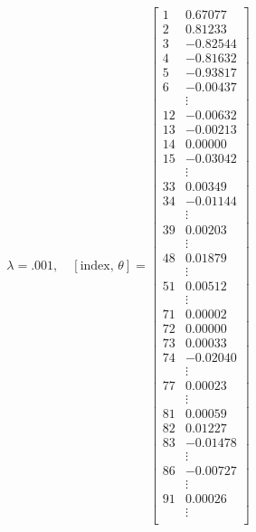 \documentclass[11pt]{article}
\begin{document}
\begin{align*}
    \lambda = .001, \quad
    [\text{index, } \theta] = 
    \begin{bmatrix}
        1  &      0.67077 \\
        2  &      0.81233 \\
        3  &     -0.82544 \\
        4  &     -0.81632 \\
        5  &     -0.93817 \\
        6  &     -0.00437 \\
            & \vdots \\
        12  &    -0.00632 \\
        13  &    -0.00213 \\
        14  &     0.00000 \\
        15  &    -0.03042 \\
            & \vdots \\
        33  &     0.00349 \\
        34  &    -0.01144 \\
            & \vdots \\
        39  &     0.00203 \\
            & \vdots \\
        48  &     0.01879 \\
            & \vdots \\
        51  &     0.00512 \\
            & \vdots \\
        71  &     0.00002 \\
        72  &     0.00000 \\
        73  &     0.00033 \\
        74  &    -0.02040 \\
            & \vdots \\
        77  &     0.00023 \\
            & \vdots \\
        81  &     0.00059 \\
        82  &     0.01227 \\
        83  &    -0.01478 \\
            & \vdots \\
        86  &    -0.00727 \\
            & \vdots \\
        91  &     0.00026 \\
            & \vdots \\

\end{bmatrix}
\end{align*}
\end{document}
